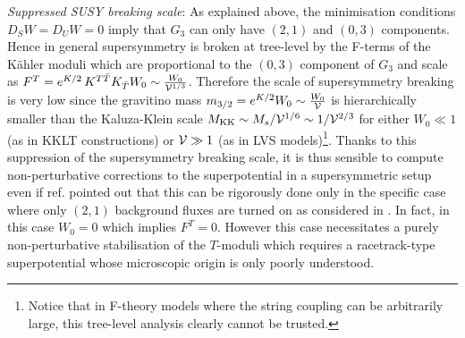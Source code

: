 \documentclass[11pt,a4paper]{article}
\newcommand{\vo}{\mathcal{V}}
\def\vo{{{\cal{V}}}}
\begin{document}
\item \emph{Suppressed SUSY breaking scale}: As explained above, the
minimisation conditions $D_S W=D_U W=0$ imply that $G_3$ can only have
$(2,1)$ and $(0,3)$ components. Hence in general supersymmetry is broken
at tree-level by the F-terms of the K\"ahler moduli which are proportional
to the $(0,3)$ component of $G_3$ and scale as $F^T =
e^{K/2}\,K^{T\bar{T}} K_{\bar{T}} W_0 \sim \frac{W_0}{\vo^{1/3}}$.
Therefore the scale of supersymmetry breaking is very low since the
gravitino mass $m_{3/2}= e^{K/2} W_0 \sim \frac{W_0}{\vo}$ is
hierarchically smaller than the Kaluza-Klein scale $M_{\rm KK}\sim
M_s/\vo^{1/6} \sim 1/\vo^{2/3}$ for either $W_0\ll 1$ (as in KKLT
constructions) or $\vo \gg 1$ (as in LVS models)\footnote{Notice that in
F-theory models where the string coupling can be arbitrarily large, this
tree-level analysis clearly cannot be trusted.}. Thanks to this
suppression of the supersymmetry breaking scale, it is thus sensible to
compute non-perturbative corrections to the superpotential in a
supersymmetric setup even if ref. \cite{Sethi:2017phn} pointed out that
this can be rigorously done only in the specific case where only $(2,1)$
background fluxes are turned on as considered in \cite{Dasgupta:1999ss}.
In fact, in this case $W_0=0$ which implies $F^T=0$. However this case
necessitates a purely non-perturbative stabilisation of the $T$-moduli
which requires a racetrack-type superpotential whose microscopic origin is
only poorly understood.
\end{document}
